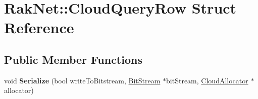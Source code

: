 \hypertarget{struct_rak_net_1_1_cloud_query_row}{\section{Rak\-Net\-:\-:Cloud\-Query\-Row Struct Reference}
\label{struct_rak_net_1_1_cloud_query_row}
}
\subsection*{Public Member Functions}
\begin{DoxyCompactItemize}
\item 
\hypertarget{struct_rak_net_1_1_cloud_query_row_a7cc83b7c447e8ffebe2500141e8ba244}{void {\bfseries Serialize} (bool write\-To\-Bitstream, \hyperlink{class_rak_net_1_1_bit_stream}{Bit\-Stream} $\ast$bit\-Stream, \hyperlink{class_rak_net_1_1_cloud_allocator}{Cloud\-Allocator} $\ast$allocator)}\label{struct_rak_net_1_1_cloud_query_row_a7cc83b7c447e8ffebe2500141e8ba244}

\end{DoxyCompactItemize}
